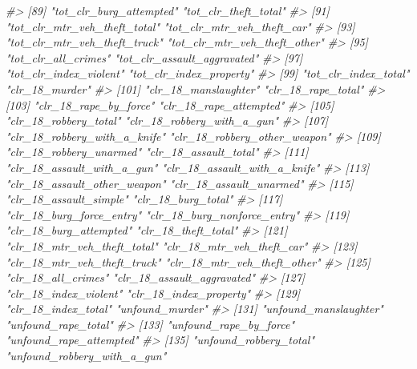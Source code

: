 \documentclass[
  12pt,
]{book}
\newenvironment{Shaded}{\begin{snugshade}}{\end{snugshade}}
\newcommand{\CommentTok}[1]{\textcolor[rgb]{0.37,0.37,0.37}{\textit{#1}}}
\begin{document}
\begin{Shaded}
\begin{Highlighting}[]
\CommentTok{\#\textgreater{}  [89] "tot\_clr\_burg\_attempted"         "tot\_clr\_theft\_total"           }
\CommentTok{\#\textgreater{}  [91] "tot\_clr\_mtr\_veh\_theft\_total"    "tot\_clr\_mtr\_veh\_theft\_car"     }
\CommentTok{\#\textgreater{}  [93] "tot\_clr\_mtr\_veh\_theft\_truck"    "tot\_clr\_mtr\_veh\_theft\_other"   }
\CommentTok{\#\textgreater{}  [95] "tot\_clr\_all\_crimes"             "tot\_clr\_assault\_aggravated"    }
\CommentTok{\#\textgreater{}  [97] "tot\_clr\_index\_violent"          "tot\_clr\_index\_property"        }
\CommentTok{\#\textgreater{}  [99] "tot\_clr\_index\_total"            "clr\_18\_murder"                 }
\CommentTok{\#\textgreater{} [101] "clr\_18\_manslaughter"            "clr\_18\_rape\_total"             }
\CommentTok{\#\textgreater{} [103] "clr\_18\_rape\_by\_force"           "clr\_18\_rape\_attempted"         }
\CommentTok{\#\textgreater{} [105] "clr\_18\_robbery\_total"           "clr\_18\_robbery\_with\_a\_gun"     }
\CommentTok{\#\textgreater{} [107] "clr\_18\_robbery\_with\_a\_knife"    "clr\_18\_robbery\_other\_weapon"   }
\CommentTok{\#\textgreater{} [109] "clr\_18\_robbery\_unarmed"         "clr\_18\_assault\_total"          }
\CommentTok{\#\textgreater{} [111] "clr\_18\_assault\_with\_a\_gun"      "clr\_18\_assault\_with\_a\_knife"   }
\CommentTok{\#\textgreater{} [113] "clr\_18\_assault\_other\_weapon"    "clr\_18\_assault\_unarmed"        }
\CommentTok{\#\textgreater{} [115] "clr\_18\_assault\_simple"          "clr\_18\_burg\_total"             }
\CommentTok{\#\textgreater{} [117] "clr\_18\_burg\_force\_entry"        "clr\_18\_burg\_nonforce\_entry"    }
\CommentTok{\#\textgreater{} [119] "clr\_18\_burg\_attempted"          "clr\_18\_theft\_total"            }
\CommentTok{\#\textgreater{} [121] "clr\_18\_mtr\_veh\_theft\_total"     "clr\_18\_mtr\_veh\_theft\_car"      }
\CommentTok{\#\textgreater{} [123] "clr\_18\_mtr\_veh\_theft\_truck"     "clr\_18\_mtr\_veh\_theft\_other"    }
\CommentTok{\#\textgreater{} [125] "clr\_18\_all\_crimes"              "clr\_18\_assault\_aggravated"     }
\CommentTok{\#\textgreater{} [127] "clr\_18\_index\_violent"           "clr\_18\_index\_property"         }
\CommentTok{\#\textgreater{} [129] "clr\_18\_index\_total"             "unfound\_murder"                }
\CommentTok{\#\textgreater{} [131] "unfound\_manslaughter"           "unfound\_rape\_total"            }
\CommentTok{\#\textgreater{} [133] "unfound\_rape\_by\_force"          "unfound\_rape\_attempted"        }
\CommentTok{\#\textgreater{} [135] "unfound\_robbery\_total"          "unfound\_robbery\_with\_a\_gun"    }

\end{Highlighting}
\end{Shaded}
\end{document}

